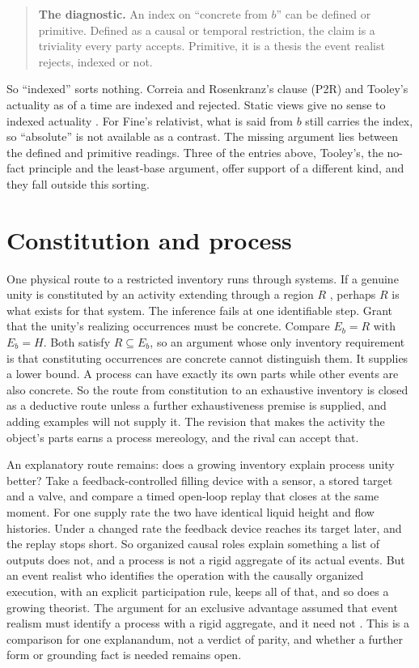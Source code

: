\documentclass[11pt]{article}
\theoremstyle{definition}
\begin{document}
\begin{quote}
\textbf{The diagnostic.} An index on ``concrete from $b$'' can be defined or primitive. Defined as a causal or temporal restriction, the
claim is a triviality every party accepts. Primitive, it is a thesis the event realist rejects, indexed or not.
\end{quote}
So ``indexed'' sorts nothing. Correia and Rosenkranz's clause (P2R) and Tooley's actuality as of a time are indexed and rejected. Static
views give no sense to indexed actuality \citep{Tooley2010}. For Fine's relativist, what is said from $b$ still carries the index, so
``absolute'' is not available as a contrast. The missing argument lies between the defined and primitive readings. Three of the entries above, Tooley's,
the no-fact principle and the least-base argument, offer support of a different kind, and they fall outside this sorting.

\section{Constitution and process}\label{sec:process}

One physical route to a restricted inventory runs through systems. If a genuine unity is constituted by an activity
extending through a region $R$ \citep{Brading2015}, perhaps $R$ is what exists for that system. The inference fails at one identifiable step.
Grant that the unity's realizing occurrences must be concrete. Compare $E_b=R$ with $E_b=H$. Both satisfy $R\subseteq E_b$, so an argument
whose only inventory requirement is that constituting occurrences are concrete cannot distinguish them. It supplies a lower bound. A process can
have exactly its own parts while other events are also concrete. So the route from constitution to an exhaustive inventory is closed as a deductive route unless a further exhaustiveness premise is supplied, and adding examples will not supply it. The revision that makes the activity the object's parts earns a process mereology, and
the rival can accept that.

An explanatory route remains: does a growing inventory explain process unity better? Take a feedback-controlled filling device with a sensor, a
stored target and a valve, and compare a timed open-loop replay that closes at the same moment. For one supply rate the two have identical
liquid height and flow histories. Under a changed rate the feedback device reaches its target later, and the replay stops short. So organized causal
roles explain something a list of outputs does not, and a process is not a rigid aggregate of its actual events. But an event realist who
identifies the operation with the causally organized execution, with an explicit participation rule, keeps all of that, and so does a growing
theorist. The argument for an exclusive advantage assumed that event realism must identify a process with a rigid aggregate, and it need not
\citep{Stout1997,Steward2013}. This is a comparison for one explanandum, not a verdict of parity, and whether a further form or grounding fact is
needed remains open.
\end{document}
